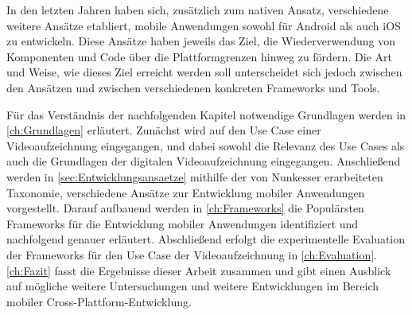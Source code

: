 In den letzten Jahren haben sich, zusätzlich zum nativen Ansatz, verschiedene weitere Ansätze etabliert, mobile Anwendungen sowohl für Android als auch iOS zu entwickeln.
Diese Ansätze haben jeweils das Ziel, die Wiederverwendung von Komponenten und Code über die Plattformgrenzen hinweg zu fördern.
Die Art und Weise, wie dieses Ziel erreicht werden soll unterscheidet sich jedoch zwischen den Ansätzen und zwischen verschiedenen konkreten Frameworks und Tools.

Für das Verständnis der nachfolgenden Kapitel notwendige Grundlagen werden in \autoref{ch:Grundlagen} erläutert.
Zunächst wird auf den Use Case einer Videoaufzeichnung eingegangen, und dabei sowohl die Relevanz des Use Cases als auch die Grundlagen der digitalen Videoaufzeichnung eingegangen.
Anschließend werden in \autoref{sec:Entwicklungsansaetze} mithilfe der von Nunkesser \cite{Nunkesser_Taxonomy_Apps} erarbeiteten Taxonomie, verschiedene Ansätze zur Entwicklung mobiler Anwendungen vorgestellt.
Darauf aufbauend werden in \autoref{ch:Frameworks} die Populärsten Frameworks für die Entwicklung mobiler Anwendungen identifiziert und nachfolgend genauer erläutert.
Abschließend erfolgt die experimentelle Evaluation der Frameworks für den Use Case der Videoaufzeichnung in \autoref{ch:Evaluation}.
\autoref{ch:Fazit} fasst die Ergebnisse dieser Arbeit zusammen und gibt einen Ausblick auf mögliche weitere Untersuchungen und weitere Entwicklungen im Bereich mobiler Cross-Plattform-Entwicklung.
